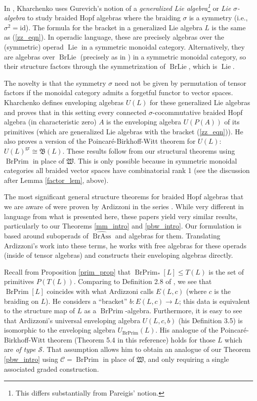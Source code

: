 \documentclass[12pt]{article}
\DeclareMathOperator{\Lie}{Lie}
\DeclareMathOperator{\BrAss}{BrAss}
\DeclareMathOperator{\BrLie}{BrLie}
\DeclareMathOperator{\BrPrim}{BrPrim}
\DeclareMathOperator{\gr}{gr}
\newcommand{\BrAsshat}{\widehat{\BrAss}} %
\newcommand{\CC} {\mathcal{C}}
\newcommand{\mB}{\mathfrak{B}}
\newcommand{\mW}{\mathfrak{W}}
\newcommand{\id}{\mbox{id}}
\theoremstyle{plain}
\theoremstyle{definition}
\theoremstyle{remark}
\begin{document}
In \cite{kharchenko}, Kharchenko uses Gurevich's notion \cite{gurevich_generalized} of a \emph{generalized Lie algebra\footnote{This differs substantially from Pareigis' notion.}} or \emph{Lie $\sigma$-algebra} to study braided Hopf algebras where the braiding $\sigma$ is a symmetry (i.e., $\sigma^2 = \id$).  The formula for the bracket in a generalized Lie algebra $L$ is the same as (\ref{zz_eqn}).  In operadic language, these are precisely algebras over the (symmetric) operad $\Lie$ in a symmetric monoidal category.  Alternatively, they are algebras over $\BrLie$ (precisely as in \cite{zhang-zhang}) in a symmetric monoidal category, so their structure factors through the symmetrization of $\BrLie$, which is $\Lie$.

The novelty is that the symmetry $\sigma$ need not be given by permutation of tensor factors if the monoidal category admits a forgetful functor to vector spaces.  Kharchenko defines enveloping algebras $U(L)$ for these generalized Lie algebras and proves that in this setting every connected $\sigma$-cocommutative braided Hopf algebra (in characteristic zero) $A$ is the enveloping algebra $U(P(A))$ of its primitives (which are generalized Lie algebras with the bracket (\ref{zz_eqn})).  He also proves a version of the Poincar\'e-Birkhoff-Witt theorem for $U(L)$: $U(L)^{\gr} \cong \mB(L)$.  These results follow from our structural theorems using $\BrPrim$ in place of $\mW$.  This is only possible because in symmetric monoidal categories all braided vector spaces have combinatorial rank 1 (see the discussion after Lemma \ref{factor_lem}, above).

The most significant general structure theorems for braided Hopf algebras that we are aware of were proven by Ardizzoni in the series \cite{ardizzoni_mm, ardizzoni_prim_gen, ardizzoni_glasgow}.  While very different in language from what is presented here, these papers yield very similar results, particularly to our Theorems \ref{mm_intro} and \ref{pbw_intro}.  Our formulation is based around suboperads of $\BrAsshat$ and algebras for them.  Translating Ardizzoni's work into these terms, he works with free algebras for these operads (inside of tensor algebras) and constructs their enveloping algebras directly.

Recall from Proposition \ref{prim_prop} that $\BrPrim_*[L] \leq T(L)$ is the set of primitives $P(T(L))$.  Comparing to Definition 2.8 of \cite{ardizzoni_prim_gen}, we see that $\BrPrim[L]$ coincides with what Ardizzoni calls $E(L,c)$ (where $c$ is the braiding on $L$).  He considers a ``bracket'' $b:E(L,c) \to L$; this data is equivalent to the structure map of $L$ as a $\BrPrim$-algebra.  Furthermore, it is easy to see that Ardizzoni's universal enveloping algebra $U(L, c, b)$ (his Definition 3.5) is isomorphic to the enveloping algebra $U_{\BrPrim}(L)$.  His analogue of the Poincar\'e-Birkhoff-Witt theorem (Theorem 5.4 in this reference) holds for those $L$ which are \emph{of type $\mathcal{S}$}.  That assumption allows him to obtain an analogue of our Theorem \ref{pbw_intro} using $\CC = \BrPrim$ in place of $\mW$, and only requiring a single associated graded construction.
\end{document}

